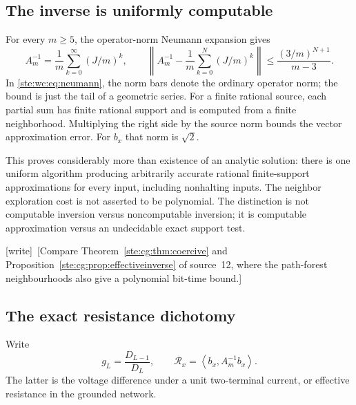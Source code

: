 \documentclass[11pt,letterpaper]{article}
\theoremstyle{definition}
\theoremstyle{remark}
\newcommand{\norm}[1]{\left\lVert #1\right\rVert}
\newcommand{\ip}[2]{\left\langle#1,#2\right\rangle}
\newcommand{\wtag}{\textup{[write]}}
\begin{document}
\subsection{The inverse is uniformly computable}
For every $m\geq5$, the operator-norm Neumann expansion gives
\begin{equation}\label{ste:wc:eq:neumann}
 A_m^{-1}=\frac1m\sum_{k=0}^{\infty}(J/m)^k,
 \qquad
 \norm{A_m^{-1}-\frac1m\sum_{k=0}^{N}(J/m)^k}
 \leq\frac{(3/m)^{N+1}}{m-3}.
\end{equation}
In \eqref{ste:wc:eq:neumann}, the norm bars denote the ordinary operator norm;
the bound is just the tail of a geometric series. For a finite rational
source, each partial sum has finite rational support and is computed from
a finite neighborhood. Multiplying the right side by the source norm
bounds the vector approximation error. For $b_x$ that norm is $\sqrt2$.

This proves considerably more than existence of an analytic solution:
there is one uniform algorithm producing arbitrarily accurate rational
finite-support approximations for every input, including nonhalting
inputs. The neighbor exploration cost is not asserted to be polynomial.
The distinction is not computable inversion versus noncomputable inversion;
it is computable approximation versus an undecidable exact support test.

\wtag\ [Compare Theorem~\ref{ste:cg:thm:coercive} and Proposition~\ref{ste:cg:prop:effectiveinverse} of source~12, where the path-forest neighbourhoods also give a polynomial bit-time bound.]

\subsection{The exact resistance dichotomy}
Write
\[
 g_L=\frac{D_{L-1}}{D_L},\qquad
 \mathcal R_x=\ip{b_x}{A_m^{-1}b_x}.
\]
The latter is the voltage difference under a unit two-terminal current, or
effective resistance in the grounded network.
\end{document}
